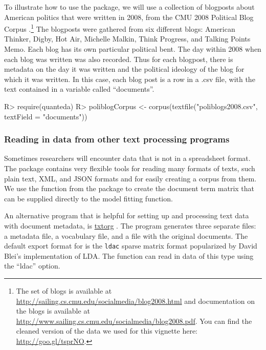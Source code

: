 \documentclass[article,shortnames]{jss}
\begin{document}
To illustrate how to use the  package, we will use a collection of blogposts about American politics that were written in 2008, from the CMU 2008 Political Blog Corpus \citep{poliblog}.\footnote{The set of blogs is available at \url{http://sailing.cs.cmu.edu/socialmedia/blog2008.html} and documentation on the blogs is available at \url{http://www.sailing.cs.cmu.edu/socialmedia/blog2008.pdf}.  You can find the cleaned version of the data we used for this vignette here: \url{http://goo.gl/tsprNO}.} The blogposts were gathered from six different blogs: American Thinker, Digby, Hot Air, Michelle Malkin, Think Progress, and Talking Points Memo.  Each blog has its own particular political bent.  The day within 2008 when each blog was written was also recorded.  Thus for each blogpost, there is metadata on the day it was written and the political ideology of the blog for which it was written. In this case, each blog post is a row in a .csv file, with the text contained in a variable called ``documents''.


\begin{Schunk}
\begin{Sinput}
R> require(quanteda)
R> poliblogCorpus <- corpus(textfile("poliblogs2008.csv", textField = "documents"))
\end{Sinput}
\end{Schunk}


\subsubsection{Reading in data from other text processing programs}

Sometimes researchers will encounter data that is not in a spreadsheet format. The  package contains very flexible tools for reading many formats of texts, such plain text, XML, and JSON formats and for easily creating a corpus from them.  We use the function  from the  package to create the document term matrix that can be supplied directly to the  model fitting function.

An alternative program that is helpful for setting up and processing text data with document metadata, is \href{www.txtorg.org}{txtorg} \citep{TextComparative}. The  program generates three separate files: a metadata file, a vocabulary file, and a file with the original documents. The default export format for  is the \texttt{ldac} sparse matrix format popularized by David Blei's implementation of LDA.  The  function can read in data of this type using the ``ldac'' option.
\end{document}
